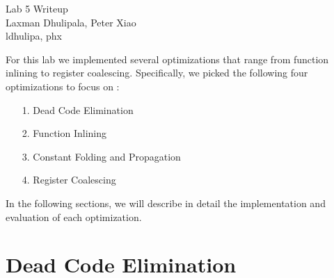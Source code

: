 \documentclass[11pt]{article}
\newcommand{\myname}{Laxman Dhulipala, Peter Xiao}
\newcommand{\myandrew}{ldhulipa, phx}
\begin{document}
\medskip                        %

\thispagestyle{plain}
\begin{center}                  %
{\Large Lab 5 Writeup} \\
 \vspace{2 mm}
\myname \\
\myandrew
\end{center}

For this lab we implemented several optimizations that range from function inlining
to register coalescing. Specifically, we picked the following four optimizations to focus
on : 

\begin{itemize}
  \item[1.] Dead Code Elimination
  \item[2.] Function Inlining
  \item[3.] Constant Folding and Propagation
  \item[4.] Register Coalescing
\end{itemize}

In the following sections, we will describe in detail the implementation and evaluation of 
each optimization. 

\section{Dead Code Elimination}
\end{document}
